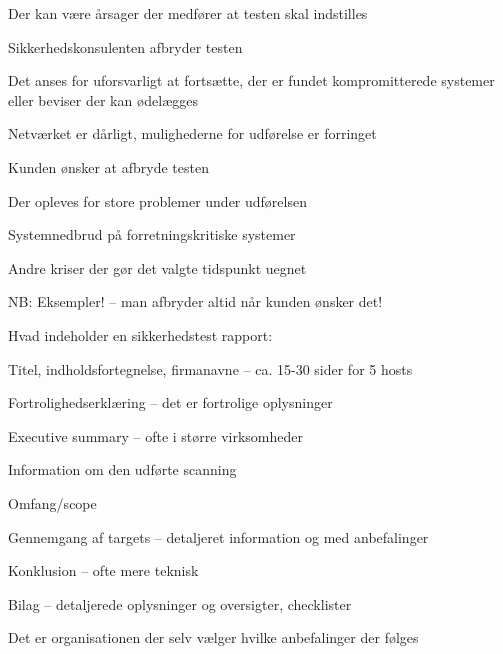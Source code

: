 \documentclass[20pt,landscape,a4paper,footrule]{foils}
\begin{document}
\begin{list1}
\item Der kan være årsager der medfører at testen skal indstilles
\item Sikkerhedskonsulenten afbryder testen
\begin{list2}
\item Det anses for uforsvarligt at fortsætte, der er fundet
  kompromitterede systemer eller beviser der kan ødelægges
\item Netværket er dårligt, mulighederne for udførelse er forringet
\end{list2}
\item Kunden ønsker at afbryde testen
\begin{list2}
\item Der opleves for store problemer under udførelsen
\item Systemnedbrud på forretningskritiske systemer
\item Andre kriser der gør det valgte tidspunkt uegnet
\end{list2}
\item NB: Eksempler! -- man afbryder altid når kunden ønsker det!
\end{list1}



\begin{list1}
\item Hvad indeholder en sikkerhedstest rapport:
\begin{list2}
\item Titel, indholdsfortegnelse, firmanavne -- ca. 15-30 sider for 5 hosts
\item Fortrolighedserklæring -- det er fortrolige oplysninger
\item Executive summary -- ofte i større virksomheder
\item Information om den udførte scanning
\item Omfang/scope
\item Gennemgang af targets -- detaljeret information og med anbefalinger
\item Konklusion -- ofte mere teknisk
\item Bilag -- detaljerede oplysninger og oversigter, checklister
\end{list2}
\item Det er organisationen der selv vælger hvilke anbefalinger der følges
\end{list1}


\end{document}
